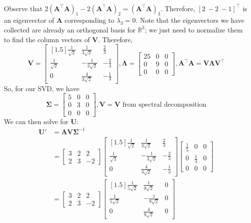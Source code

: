 \documentclass{article}
\begin{document}
\begin{enumerate}[label=(\alph*)]
{\begin{align*}
\end{align*} Observe that $2(\mathbf{A^{\top}A})_1 - 2(\mathbf{A^{\top}A})_2 = (\mathbf{A^{\top}A})_3$. Therefore, $[2\ -2\ -1]^{\top}$ is an eigenvector of $\mathbf{A}$ corresponding to $\lambda_3 = 0$. Note that the eigenvectors we have collected are already an orthogonal basis for $\mathbb{R}^3$; we just need to normalize them to find the column vectors of $\mathbf{V}$. Therefore, $$\mathbf{V} = \begin{bmatrix}[1.5] \frac{1}{\sqrt{2}} & \frac{1}{3\sqrt{2}} & \frac{2}{3} \\ \frac{1}{\sqrt{2}} & -\frac{1}{3\sqrt{2}} & -\frac{2}{3} \\ 0 & \frac{4}{3\sqrt{2}} & -\frac{1}{3} \end{bmatrix}, \mathbf{\Lambda} = \begin{bmatrix} 25 &  0 & 0 \\ 0 & 9 & 0 \\ 0 & 0 & 0 \end{bmatrix}, \mathbf{A^{\top}A = V\Lambda V^{\top}}$$ So, for our SVD, we have $$\mathbf{\Sigma} = \begin{bmatrix} 5 & 0 & 0 \\ 0 & 3 & 0 \\ 0 & 0 & 0 \end{bmatrix}, \mathbf{V} = \mathbf{V} \text{ from spectral decomposition}$$ We can then solve for $\mathbf{U}$: \begin{align*}
\mathbf{U'} &= \mathbf{AV\Sigma}^{-1} \\
&= \begin{bmatrix} 3 & 2 & 2 \\ 2 & 3 & -2 \end{bmatrix}\begin{bmatrix}[1.5] \frac{1}{\sqrt{2}} & \frac{1}{3\sqrt{2}} & \frac{2}{3} \\ \frac{1}{\sqrt{2}} & -\frac{1}{3\sqrt{2}} & -\frac{2}{3} \\ 0 & \frac{4}{3\sqrt{2}} & -\frac{1}{3} \end{bmatrix}\begin{bmatrix} \frac{1}{5} & 0 & 0 \\ 0 & \frac{1}{3} & 0 \\ 0 & 0 & 0 \end{bmatrix} \\
&= \begin{bmatrix} 3 & 2 & 2 \\ 2 & 3 & -2 \end{bmatrix}\begin{bmatrix}[1.5] \frac{1}{5\sqrt{2}} & \frac{1}{9\sqrt{2}} & 0 \\ \frac{1}{5\sqrt{2}} & -\frac{1}{9\sqrt{2}} & 0 \\ 0 & \frac{4}{9\sqrt{2}} & 0 \end{bmatrix} \\

\end{align*}}
\end{enumerate}
\end{document}

